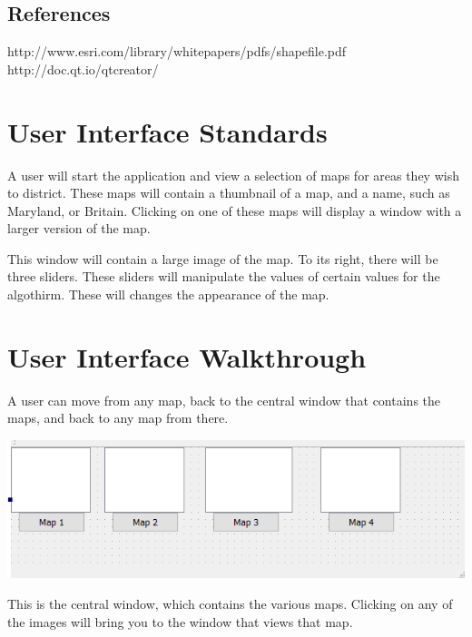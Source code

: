 \documentclass{article}
\begin{document}
\vspace{2.5mm}

\subsection{References}

http://www.esri.com/library/whitepapers/pdfs/shapefile.pdf
http://doc.qt.io/qtcreator/

\vspace{2.5mm}

\section{User Interface Standards}

A user will start the application and view a selection of maps for areas they wish to district.  These maps will contain a thumbnail of a map, and a name, such as Maryland, or Britain.  Clicking on one of these maps will display a window with a larger version of the map.   

This window will contain a large image of the map.  To its right,  there will be three sliders.  These sliders will manipulate the values of certain values for the algothirm.  These will changes the appearance of the map.

\vspace{2.5mm}

\section{User Interface Walkthrough}
A user can move from any map, back to the central window that contains the maps, and back to any map from there.

\vspace{10mm}
	
\hspace*{5mm}   
\includegraphics[scale=1]{mainwin.png}

\vspace{5mm}


This is the central window, which contains the various maps.  Clicking on any of the images will bring you to the window that views that map.
\end{document}
